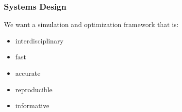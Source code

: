 \begin{frame}
	\frametitle{Systems Design}
    We want a simulation and optimization framework that is:
	\begin{itemize}
		\item interdisciplinary
        \item fast
        \item accurate
        \item reproducible
        \item informative
	\end{itemize}
	
\end{frame}